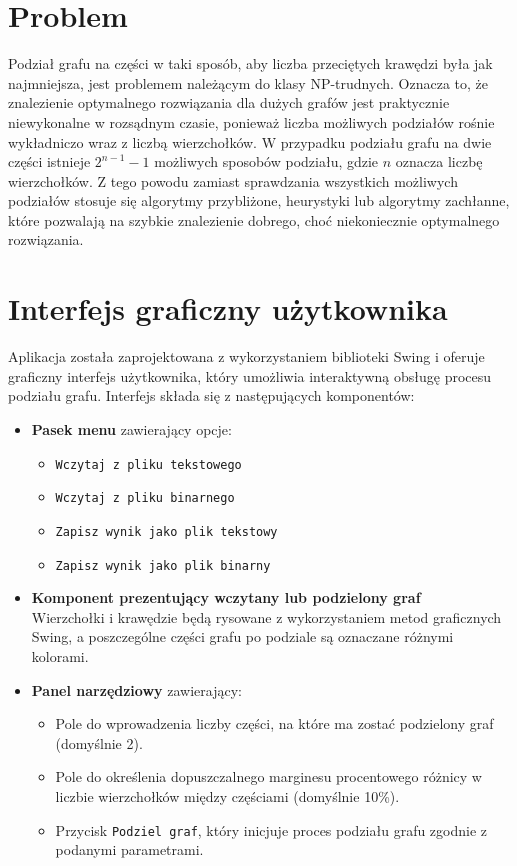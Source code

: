 \documentclass{article}
\begin{document}
\section{Problem}

    Podział grafu na części w taki sposób, aby liczba przeciętych krawędzi była jak najmniejsza, jest problemem należącym do klasy NP-trudnych. Oznacza to, że znalezienie optymalnego rozwiązania dla dużych grafów jest praktycznie niewykonalne w rozsądnym czasie, ponieważ liczba możliwych podziałów rośnie wykładniczo wraz z liczbą wierzchołków.
    W przypadku podziału grafu na dwie części istnieje \( 2^{n-1} - 1 \) możliwych sposobów podziału, gdzie \( n \) oznacza liczbę wierzchołków. Z tego powodu zamiast sprawdzania wszystkich możliwych podziałów stosuje się algorytmy przybliżone, heurystyki lub algorytmy zachłanne, które pozwalają na szybkie znalezienie dobrego, choć niekoniecznie optymalnego rozwiązania.



\section{Interfejs graficzny użytkownika}

    Aplikacja została zaprojektowana z wykorzystaniem biblioteki Swing i oferuje graficzny interfejs użytkownika, który umożliwia interaktywną obsługę procesu podziału grafu. Interfejs składa się z następujących komponentów:
    
    \begin{itemize}
        \item \textbf{Pasek menu} zawierający opcje:
        \begin{itemize}
            \item \texttt{Wczytaj z pliku tekstowego}
            \item \texttt{Wczytaj z pliku binarnego}
            \item \texttt{Zapisz wynik jako plik tekstowy}
            \item \texttt{Zapisz wynik jako plik binarny}
        \end{itemize}
        \item \textbf{Komponent prezentujący wczytany lub podzielony graf} \\
        Wierzchołki i krawędzie będą rysowane z wykorzystaniem metod graficznych Swing, a poszczególne części grafu po podziale są oznaczane różnymi kolorami.
        \item \textbf{Panel narzędziowy} zawierający:
        \begin{itemize}
            \item Pole do wprowadzenia liczby części, na które ma zostać podzielony graf (domyślnie 2).
            \item Pole do określenia dopuszczalnego marginesu procentowego różnicy w liczbie wierzchołków między częściami (domyślnie 10\%).
            \item Przycisk \texttt{Podziel graf}, który inicjuje proces podziału grafu zgodnie z podanymi parametrami.
        \end{itemize}
    \end{itemize}
    
\end{document}
